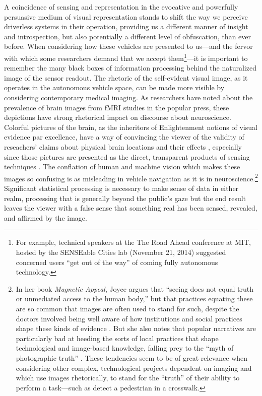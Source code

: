 A coincidence of sensing and representation in the evocative and
powerfully persuasive medium of visual representation stands to shift
the way we perceive driverless systems in their operation, providing
us a different manner of insight and introspection, but also
potentially a different level of obfuscation, than ever before. When
considering how these vehicles are presented to us---and the fervor with
which some researchers demand that we accept them\footnote{For
  example, technical speakers at the The Road Ahead conference at MIT,
hosted by the SENSEable Cities lab (November 21, 2014) suggested
concerned users ``get out of the way'' of coming fully autonomous
technology.}---it is important to 
remember the many black boxes of information processing behind the
naturalized image of the sensor readout. The rhetoric of the
self-evident visual image, as it operates in the autonomous vehicle
space, can be made more visible by considering contemporary medical
imaging. As researchers have noted about the prevalence of brain
images from fMRI studies in the popular press, these depictions have
strong rhetorical impact on discourse about neuroscience. Colorful
pictures of the brain, as the inheritors of Enlightenment notions of
visual evidence par excellence, have a way of convincing the viewer of
the validity of reseachers' claims about physical brain locations and
their effects \cite{lehrerNeuro}, especially since those pictures are presented as the
direct, transparent products of sensing techniques \cite[p.
  76]{kellyMagnetic}. The conflation of 
human and machine vision which makes these images so confusing is as
misleading in vehicle navigation as it is in neuroscience.\footnote{In
her book \emph{Magnetic Appeal}, Joyce argues that ``seeing does not
equal truth or unmediated access to the human body,'' but that
practices equating these are so common that images are often used to
stand for such, despite the doctors involved being well aware of how
institutions and social practices shape these kinds of evidence
\cite[p. 76]{kellyMagnetic}. But she also notes that
popular narratives are particularly bad at heeding the sorts of local
practices that shape technological and image-based knowledge, falling
prey to the ``myth of photographic truth'' \cite[p.
  75]{kellyMagnetic}. These tendencies seem to be of great relevance
when considering other complex, technological projects dependent on
imaging and which use images rhetorically, to stand for the ``truth''
of their ability to perform a task---such as detect a pedestrian in a
crosswalk.} Significant 
statistical processing is necessary to make sense of data in either
realm, processing that is generally beyond the public's gaze \cite{koerthFish} but the
end result leaves the viewer with a false sense that something real
has been sensed, revealed, and affirmed by the image.


